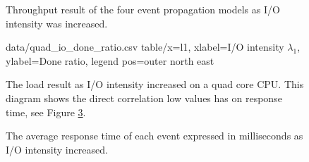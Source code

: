 \begin{figure}[h!]
    \centering

    \caption[Throughput result when I/O intensity was increased.]{Throughput
    result of the four event propagation models as I/O intensity was
    increased.}

    \label{fig:io_throughput}
\end{figure}

\begin{figure}[h!]
    \centering
    \performanceplot
    {data/quad_io_done_ratio.csv}
    {table/x=l1, xlabel=I/O intensity $\lambda_1$, ylabel=Done ratio, legend pos=outer north east}

    \caption[Load result when I/O intensity was increased.]{The load result as
    I/O intensity increased on a quad core CPU. This diagram shows the direct
    correlation low values has on response time, see Figure
    \ref{fig:io_avg_d0}.}

    \label{fig:quad_io_done_ratio}
\end{figure}

\begin{figure}[h!]
    \centering

    \caption[Response time result when I/O intensity was increased.]{The
    average response time of each event expressed in milliseconds as I/O
    intensity increased.}

    \label{fig:io_avg_d0}
\end{figure}
